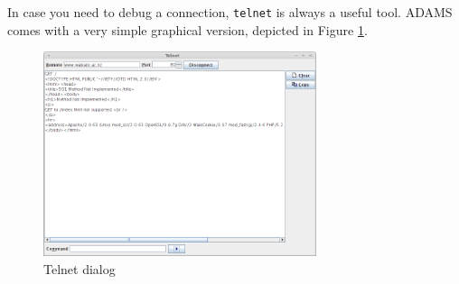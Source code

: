 \documentclass[a4paper]{book}
\begin{document}
In case you need to debug a connection, \texttt{telnet} is always a useful tool.
ADAMS comes with a very simple graphical version, depicted in Figure \ref{telnet}.
\begin{figure}[htb]
  \centering
  \includegraphics[width=8.0cm]{images/telnet.png}
  \caption{Telnet dialog}
  \label{telnet}
\end{figure}



\end{document}
